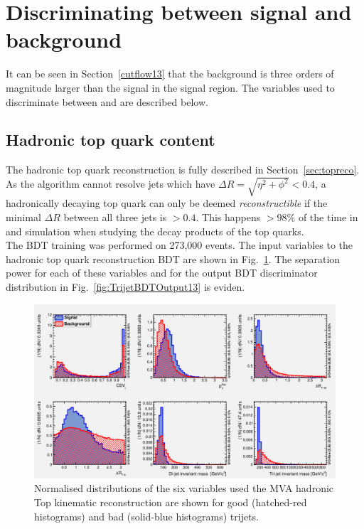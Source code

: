 \section{Discriminating between signal and background}
\label{sec:discriminating13}
It can be seen in Section~\ref{cutflow13} that the \ttbar background is three orders of magnitude larger than the \tttt signal in the signal region. The variables used to discriminate between \ttbar and \tttt are described below.

\subsection{Hadronic top quark content}
\label{sec:topContent13}
The hadronic top quark reconstruction is fully described in Section~\ref{sec:topreco}.\\
As the \antikt algorithm cannot resolve jets which have $\Delta R = \sqrt{  \eta^{2} + \phi^{2} } < 0.4$, a hadronically decaying top quark can only be deemed \emph{reconstructible} if the minimal $\Delta R$ between all three jets is $> 0.4$. This happens $> 98\%$ of the time in \ttbar and \tttt simulation when studying the decay products of the top quarks.\\
The BDT training was performed on 273,000 \ttbar events. The input variables to the hadronic top quark reconstruction BDT are shown in Fig.~\ref{fig:TrijetBDTInputFeatures13}. The separation power for each of these variables and for the output BDT discriminator distribution in Fig.~\ref{fig:TrijetBDTOutput13} is eviden.

\begin{figure}[ht!]
\centering
\includegraphics[width=\linewidth]{images/Run2/variables_id_c1.pdf}
\caption{Normalised distributions of the six variables used the MVA hadronic Top kinematic reconstruction are shown for good (hatched-red histograms) and bad (solid-blue histograms) trijets.}
\label{fig:TrijetBDTInputFeatures13}
\end{figure}


